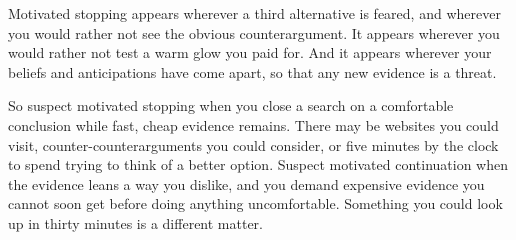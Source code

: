 Motivated stopping appears wherever a third alternative is feared, and wherever you would rather not see the obvious counterargument. It appears wherever you would rather not test a warm glow you paid for. And it appears wherever your beliefs and anticipations have come apart, so that any new evidence is a threat. 

So suspect motivated stopping when you close a search on a comfortable conclusion while fast, cheap evidence remains. There may be websites you could visit, counter-counterarguments you could consider, or five minutes by the clock to spend trying to think of a better option. Suspect motivated continuation when the evidence leans a way you dislike, and you demand expensive evidence you cannot soon get before doing anything uncomfortable. Something you could look up in thirty minutes is a different matter. 
